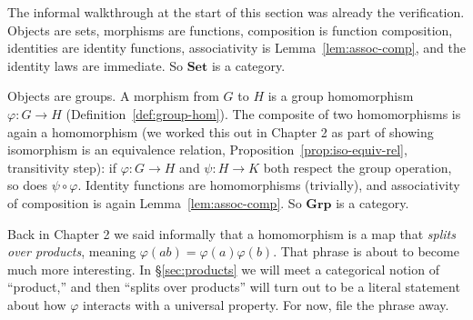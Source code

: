 \begin{example}
The informal walkthrough at the start of this section was already the verification.
Objects are sets, morphisms are functions, composition is function composition,
identities are identity functions, associativity is Lemma~\ref{lem:assoc-comp}, and
the identity laws are immediate. So $\mathbf{Set}$ is a category.
\end{example}

\begin{example}
Objects are groups. A morphism from $G$ to $H$ is a group homomorphism
$\varphi : G \to H$ (Definition~\ref{def:group-hom}). The composite of two
homomorphisms is again a homomorphism (we worked this out in Chapter 2 as part
of showing isomorphism is an equivalence relation, Proposition~\ref{prop:iso-equiv-rel},
transitivity step): if $\varphi : G \to H$ and $\psi : H \to K$ both respect the
group operation, so does $\psi \circ \varphi$. Identity functions are
homomorphisms (trivially), and associativity of composition is again
Lemma~\ref{lem:assoc-comp}. So $\mathbf{Grp}$ is a category.

Back in Chapter 2 we said informally that a homomorphism is a map that
\textit{splits over products}, meaning $\varphi(ab) = \varphi(a)\varphi(b)$. That
phrase is about to become much more interesting. In \S\ref{sec:products} we will meet a
categorical notion of ``product,'' and then ``splits over products'' will turn out
to be a literal statement about how $\varphi$ interacts with a universal property.
For now, file the phrase away.
\end{example}

